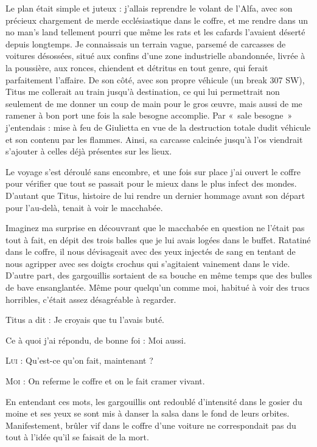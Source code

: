 Le plan était simple et juteux : j’allais reprendre le volant de l’Alfa, avec son précieux chargement de merde ecclésiastique dans le coffre, et me rendre dans un no man’s land tellement pourri que même les rats et les cafards l’avaient déserté depuis longtemps. Je connaissais un terrain vague, parsemé de carcasses de voitures désossées, situé aux confins d’une zone industrielle abandonnée, livrée à la poussière, aux ronces, chiendent et détritus en tout genre, qui ferait parfaitement l’affaire. De son côté, avec son propre véhicule (un break 307 SW), Titus me collerait au train jusqu’à destination, ce qui lui permettrait non seulement de me donner un coup de main pour le gros œuvre, mais aussi de me ramener à bon port une fois la sale besogne accomplie. Par «~sale besogne~» j’entendais : mise à feu de Giulietta en vue de la destruction totale dudit véhicule et son contenu par les flammes. Ainsi, sa carcasse calcinée jusqu’à l’os viendrait s’ajouter à celles déjà présentes sur les lieux.

Le voyage s’est déroulé sans encombre, et une fois sur place j’ai ouvert le coffre pour vérifier que tout se passait pour le mieux dans le plus infect des mondes. D’autant que Titus, histoire de lui rendre un dernier hommage avant son départ pour l’au-delà, tenait à voir le macchabée.

Imaginez ma surprise en découvrant que le macchabée en question ne l’était pas tout à fait, en dépit des trois balles que je lui avais logées dans le buffet. Ratatiné dans le coffre, il nous dévisageait avec des yeux injectés de sang en tentant de nous agripper avec ses doigts crochus qui s’agitaient vainement dans le vide. D’autre part, des gargouillis sortaient de sa bouche en même temps que des bulles de bave ensanglantée. Même pour quelqu’un comme moi, habitué à voir des trucs horribles, c’était assez désagréable à regarder.

\begin{dialogue}

Titus a dit : Je croyais que tu l’avais buté.

Ce à quoi j’ai répondu, de bonne foi : Moi aussi.

\textsc{Lui} : Qu’est-ce qu’on fait, maintenant ?

\textsc{Moi} : On referme le coffre et on le fait cramer vivant.

\end{dialogue}

En entendant ces mots, les gargouillis ont redoublé d’intensité dans le gosier du moine et ses yeux se sont mis à danser la salsa dans le fond de leurs orbites. Manifestement, brûler vif dans le coffre d’une voiture ne correspondait pas du tout à l’idée qu’il se faisait de la mort.

